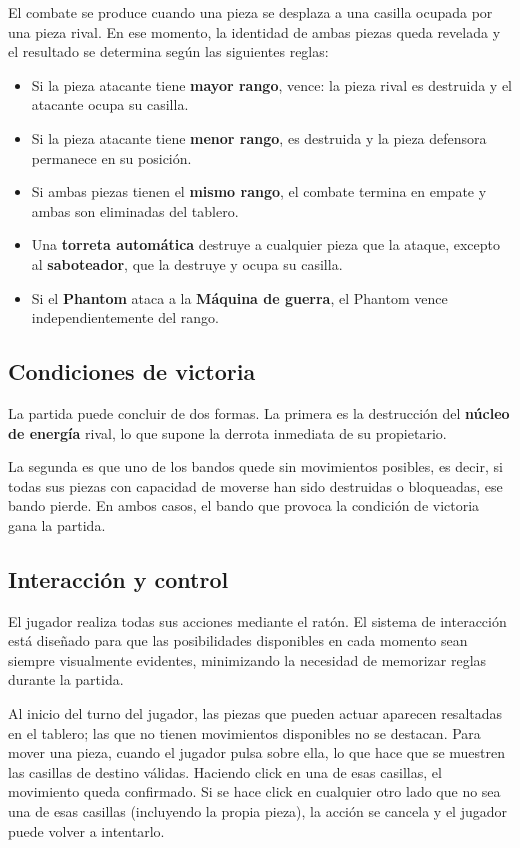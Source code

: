 El combate se produce cuando una pieza se desplaza a una casilla ocupada por una pieza rival. En ese momento, la identidad de ambas piezas queda revelada y el resultado se determina según las siguientes reglas:

\begin{itemize}
	\item Si la pieza atacante tiene \textbf{mayor rango}, vence: la pieza rival es destruida y el atacante ocupa su casilla.
	\item Si la pieza atacante tiene \textbf{menor rango}, es destruida y la pieza defensora permanece en su posición.
	\item Si ambas piezas tienen el \textbf{mismo rango}, el combate termina en empate y ambas son eliminadas del tablero.
	\item Una \textbf{torreta automática} destruye a cualquier pieza que la ataque, excepto al \textbf{saboteador}, que la destruye y ocupa su casilla.
	\item Si el \textbf{Phantom} ataca a la \textbf{Máquina de guerra}, el Phantom vence independientemente del rango.
\end{itemize}

\subsection{Condiciones de victoria}

La partida puede concluir de dos formas. La primera es la destrucción del \textbf{núcleo de energía} rival, lo que supone la derrota inmediata de su propietario.

La segunda es que uno de los bandos quede sin movimientos posibles, es decir, si todas sus piezas con capacidad de moverse han sido destruidas o bloqueadas, ese bando pierde. En ambos casos, el bando que provoca la condición de victoria gana la partida.

\subsection{Interacción y control}

El jugador realiza todas sus acciones mediante el ratón. El sistema de interacción está diseñado para que las posibilidades disponibles en cada momento sean siempre visualmente evidentes, minimizando la necesidad de memorizar reglas durante la partida.

Al inicio del turno del jugador, las piezas que pueden actuar aparecen resaltadas en el tablero; las que no tienen movimientos disponibles no se destacan. Para mover una pieza, cuando el jugador pulsa
sobre ella, lo que hace que se muestren las casillas de destino válidas. Haciendo click en una de esas casillas, el movimiento queda confirmado. Si se hace click en cualquier otro lado que no sea una de esas casillas (incluyendo la propia pieza), la acción se cancela y el jugador puede volver a intentarlo.

